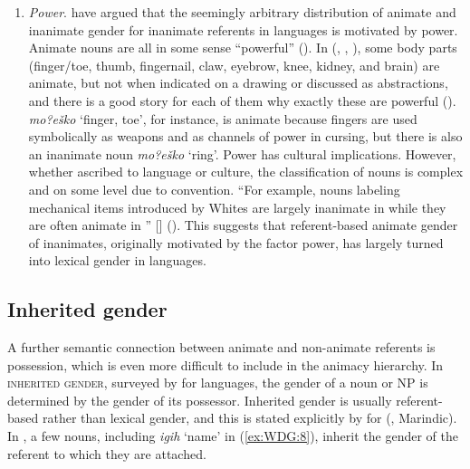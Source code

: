 \documentclass[output=collectionpaper]{langsci/langscibook}
\begin{document}
\begin{enumerate}[label=(\roman*)]
\item \textit{Power}. \cite{Straus1982} have argued that the seemingly arbitrary distribution of animate and inanimate gender for inanimate referents in  languages is motivated by power. Animate nouns are all in some sense ``powerful'' (\citealt[135]{Straus1982}). In  (, , ), some body parts (finger/toe, thumb, fingernail, claw, eyebrow, knee, kidney, and brain) are animate, but not when indicated on a drawing or discussed as abstractions, and there is a good story for each of them why exactly these are powerful (\citealt[128--130]{Straus1982}).  \textit{mo?eško} `finger, toe', for instance, is animate because fingers are used symbolically as weapons and as channels of power in cursing, but there is also an inanimate noun \textit{mo?eško} `ring'. Power has cultural implications. However, whether ascribed to language or culture, the classification of nouns is complex and on some level due to convention. ``For example, nouns labeling mechanical items introduced by Whites are largely inanimate in  while they are often animate in '' [] (\citealt[133]{Straus1982}). This suggests that referent-based animate gender of inanimates, originally motivated by the factor power, has largely turned into lexical gender in  languages.
\end{enumerate}

  \subsection{Inherited gender}
\label{sec:WDG:3.4}

A further semantic connection between animate and non-animate referents is possession, which is even more difficult to include in the animacy hierarchy. In \textsc{inherited gender}, surveyed by \cite{Evans1994} for  languages, the gender of a noun or NP is determined by the gender of its possessor. Inherited gender is usually referent-based rather than lexical gender, and this is stated explicitly by \cite[186]{Olsson2017} for  (, Marindic). In , a few nouns, including \textit{igih} `name' in (\ref{ex:WDG:8}), inherit the gender of the referent to which they are attached.

%
\end{document}
